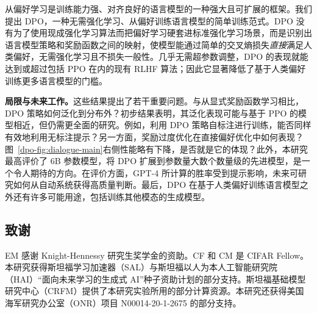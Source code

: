 从偏好学习是训练能力强、对齐良好的语言模型的一种强大且可扩展的框架。我们提出 DPO，一种无需强化学习、从偏好训练语言模型的简单训练范式。DPO 没有为了使用现成强化学习算法而把偏好学习硬套进标准强化学习场景，而是识别出语言模型策略和奖励函数之间的映射，使模型能通过简单的交叉熵损失\emph{直接}满足人类偏好，无需强化学习且不损失一般性。几乎无需超参数调整，DPO 的表现就能达到或超过包括 PPO 在内的现有 RLHF 算法；因此它显著降低了基于人类偏好训练更多语言模型的门槛。

\textbf{局限与未来工作。}这些结果提出了若干重要问题。与从显式奖励函数学习相比，DPO 策略如何泛化到分布外？初步结果表明，其泛化表现可能与基于 PPO 的模型相近，但仍需更全面的研究。例如，利用 DPO 策略自标注进行训练，能否同样有效地利用无标注提示？另一方面，奖励过度优化在直接偏好优化中如何表现？图~\ref{dpo-fig:dialogue-main}右侧性能略有下降，是否就是它的体现？此外，本研究最高评价了 6B 参数模型，将 DPO 扩展到参数量大数个数量级的先进模型，是一个令人期待的方向。在评价方面，GPT-4 所计算的胜率受到提示影响，未来可研究如何从自动系统获得高质量判断。最后，DPO 在基于人类偏好训练语言模型之外还有许多可能用途，包括训练其他模态的生成模型。

\subsection*{致谢}
EM 感谢 Knight-Hennessy 研究生奖学金的资助。CF 和 CM 是 CIFAR Fellow。本研究获得斯坦福学习加速器（SAL）与斯坦福以人为本人工智能研究院（HAI）“面向未来学习的生成式 AI”种子资助计划的部分支持。斯坦福基础模型研究中心（CRFM）提供了本研究实验所用的部分计算资源。本研究还获得美国海军研究办公室（ONR）项目 N00014-20-1-2675 的部分支持。









